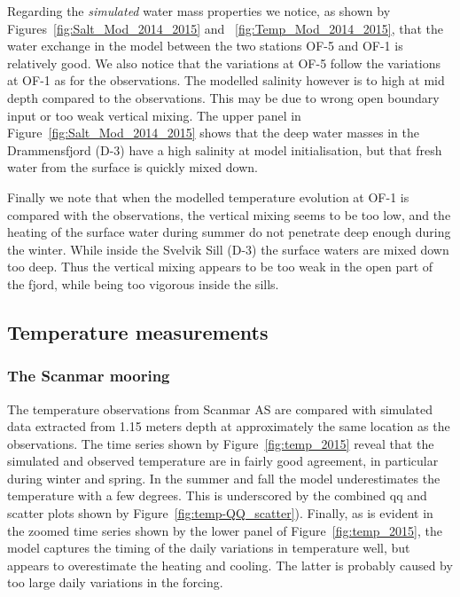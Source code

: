 Regarding the \emph{simulated} water mass properties we notice, as shown by Figures~\ref{fig:Salt_Mod_2014_2015} and ~\ref{fig:Temp_Mod_2014_2015}, that the water exchange in the model between the two stations OF-5 and OF-1 is relatively good. We also notice that the variations at OF-5 follow the variations at OF-1 as for the observations. The modelled salinity however is to high at mid depth compared to the observations. This may be due to wrong open boundary input or too weak vertical mixing. The upper panel in Figure~\ref{fig:Salt_Mod_2014_2015} shows that the deep water masses in the Drammensfjord (D-3) have a high salinity at model initialisation, but that fresh water from the surface is quickly mixed down.


Finally we note that when the modelled temperature evolution at OF-1 is compared with the observations, the vertical mixing seems to be too low, and the heating of the surface water during summer do not penetrate deep enough during the winter. While inside the Svelvik Sill (D-3) the surface waters are mixed down too deep. Thus the vertical mixing appears to be too weak in the open part of the fjord, while being too vigorous inside the sills.


\clearpage
\subsection{Temperature measurements}
\label{subsec:tempee}

\subsubsection{The Scanmar mooring}
The temperature observations from Scanmar AS are compared with simulated data extracted from 1.15 meters depth at approximately the same location as the observations. The time series shown by Figure~\ref{fig:temp_2015} reveal that the simulated and observed temperature are in fairly good agreement, in particular during winter and spring. In the summer and fall the model underestimates the temperature with a few degrees. This is underscored by the combined qq and scatter plots shown by Figure~\ref{fig:temp-QQ_scatter}). Finally, as is evident in the zoomed time series shown by the lower panel of Figure~\ref{fig:temp_2015}, the model captures the timing of the daily variations in temperature well, but appears to overestimate the heating and cooling. The latter is probably caused by too large daily variations in the forcing.
 
 

